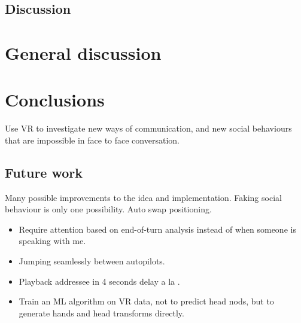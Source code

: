 \documentclass[]{simple-thesis}
\begin{document}
\section{Discussion}


\chapter{General discussion}\label{general_discussion}


\chapter{Conclusions}\label{conclusions}

Use VR to investigate new ways of communication, and new social behaviours that are impossible in face to face conversation.

\section{Future work}

Many possible improvements to the idea and implementation.
Faking social behaviour is only one possibility.
Auto swap positioning.

\begin{itemize}
  \item Require attention based on end-of-turn analysis instead of when someone is speaking with me.
  \item Jumping seamlessly between autopilots.
  \item Playback addressee in 4 seconds delay a la \cite{Bailenson2005}.
  \item Train an ML algorithm on VR data, not to predict head nods, but to generate hands and head transforms directly.
\end{itemize}


\cleardoublepage
{}
{}


\end{document}
